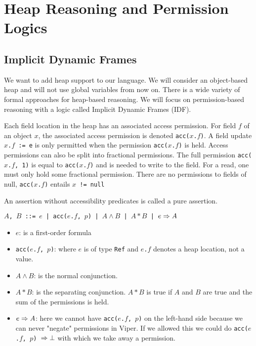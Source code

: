 \section{Heap Reasoning and Permission Logics}
\subsection{Implicit Dynamic Frames}
\begin{mytitle} We want to add heap support to our language. We will consider an object-based heap and will not use global variables from now on. There is a wide variety of formal approaches for heap-based reasoning. We will focus on permission-based reasoning with a logic called Implicit Dynamic Frames (IDF).
\end{mytitle}
\begin{mytitle} Each field location in the heap has an associated access permission. For field $f$ of an object $x$, the associated access permission is denoted \texttt{acc($x$.$f$)}. A field update \texttt{$x$.$f$ := e} is only permitted when the permission \texttt{acc($x$.$f$)} is held. Access permissions can also be split into fractional permissions. The full permission \texttt{acc($x$.$f$, 1)} is equal to \texttt{acc($x$.$f$)} and is needed to write to the field. For a read, one must only hold some fractional permission. There are no permissions to fields of null, \texttt{acc($x$.$f$)} entails \texttt{$x$ != null}
\end{mytitle}
\begin{mytitle} An assertion without accessibility predicates is called a pure assertion.
\end{mytitle}
\begin{mytitle} \texttt{$A$, $B$ ::= $e$ | acc($e$.$f$, $p$) | $A \land B$ | $A * B$ | $e \Rightarrow A$}
\begin{itemize}
    \item $e$: is a first-order formula
    \item \texttt{acc($e$.$f$, $p$)}: where $e$ is of type \texttt{Ref} and \texttt{$e$.$f$} denotes a heap location, not a value.
    \item $A \land B$: is the normal conjunction.
    \item $A * B$: is the separating conjunction. $A * B$ is true if $A$ and $B$ are true and the sum of the permissions is held.
    \item $e \Rightarrow A$: here we cannot have \texttt{acc($e$.$f$, $p$)} on the left-hand side because we can never "negate" permissions in Viper. If we allowed this we could do \texttt{acc($e$.$f$, $p$) $\Rightarrow \bot$} with which we take away a permission.
\end{itemize}
\end{mytitle}
